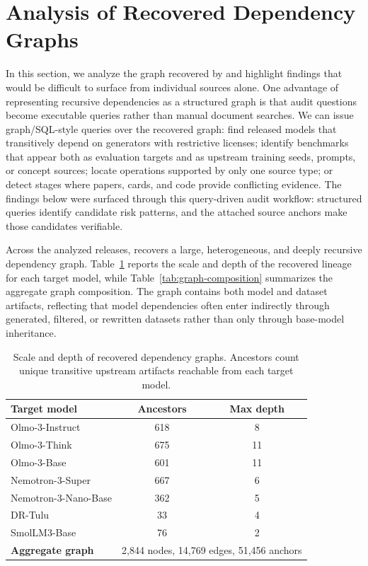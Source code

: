 \section{Analysis of Recovered Dependency Graphs}\label{sec:findings}

In this section, we analyze the graph recovered by \system{} and highlight findings that would be difficult to surface from individual sources alone. One advantage of representing recursive dependencies as a structured graph is that audit questions become executable queries rather than manual document searches. We can issue graph/SQL-style queries over the recovered graph: find released models that transitively depend on generators with restrictive licenses; identify benchmarks that appear both as evaluation targets and as upstream training seeds, prompts, or concept sources; locate operations supported by only one source type; or detect stages where papers, cards, and code provide conflicting evidence. The findings below were surfaced through this query-driven audit workflow: structured queries identify candidate risk patterns, and the attached source anchors make those candidates verifiable.

Across the analyzed releases, \system{} recovers a large, heterogeneous, and deeply recursive dependency graph. Table~\ref{tab:graph-scale} reports the scale and depth of the recovered lineage for each target model, while Table~\ref{tab:graph-composition} summarizes the aggregate graph composition. The graph contains both model and dataset artifacts, reflecting that model dependencies often enter indirectly through generated, filtered, or rewritten datasets rather than only through base-model inheritance.

\begin{table}[t]
\centering
\small
\caption{Scale and depth of recovered dependency graphs. Ancestors count unique transitive upstream artifacts reachable from each target model.}
\label{tab:graph-scale}
\begin{tabular}{lcc}
\toprule
Target model & Ancestors & Max depth \\
\midrule
Olmo-3-Instruct & 618 & 8 \\
Olmo-3-Think & 675 & 11 \\
Olmo-3-Base & 601 & 11 \\
Nemotron-3-Super & 667 & 6 \\
Nemotron-3-Nano-Base & 362 & 5 \\
DR-Tulu & 33 & 4 \\
SmolLM3-Base & 76 & 2 \\
\midrule
\textbf{Aggregate graph} & \multicolumn{2}{c}{2,844 nodes, 14,769 edges, 51,456 anchors} \\
\bottomrule
\end{tabular}
\end{table}

